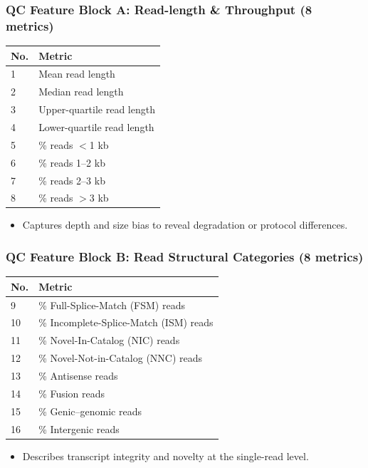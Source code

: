 \documentclass[aspectratio=169]{beamer}
\begin{document}
\begin{frame}
  \frametitle{QC Feature Block A: Read-length \& Throughput (8 metrics)}
  \begin{table}[t]
    \centering
    \small
    \begin{tabular}{@{}ll@{}}
      \toprule
      No. & Metric \\
      \midrule
       1 & Mean read length \\
       2 & Median read length \\
       3 & Upper-quartile read length \\
       4 & Lower-quartile read length \\
       5 & \% reads $<\!$1 kb \\
       6 & \% reads 1--2 kb \\
       7 & \% reads 2--3 kb \\
       8 & \% reads $>\!$3 kb \\
      \bottomrule
    \end{tabular}
  \end{table}
  \vspace{0.4em}
  \begin{itemize}
    \item Captures depth and size bias to reveal degradation or protocol differences.
  \end{itemize}
\end{frame}

\begin{frame}
  \frametitle{QC Feature Block B: Read Structural Categories (8 metrics)}
  \begin{table}[t]
    \centering
    \small
    \begin{tabular}{@{}ll@{}}
      \toprule
      No. & Metric \\
      \midrule
       9  & \% Full-Splice-Match (FSM) reads \\
       10 & \% Incomplete-Splice-Match (ISM) reads \\
       11 & \% Novel-In-Catalog (NIC) reads \\
       12 & \% Novel-Not-in-Catalog (NNC) reads \\
       13 & \% Antisense reads \\
       14 & \% Fusion reads \\
       15 & \% Genic–genomic reads \\
       16 & \% Intergenic reads \\
      \bottomrule
    \end{tabular}
  \end{table}
  \vspace{0.4em}
  \begin{itemize}
    \item Describes transcript integrity and novelty at the single-read level.
  \end{itemize}
\end{frame}
\end{document}
